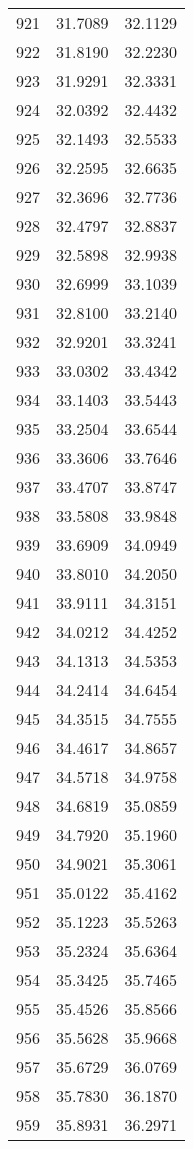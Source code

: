 \documentclass{article}
\begin{document}
\begin{longtable}{|c|c|c|}
921 & 31.7089 & 32.1129 \\
922 & 31.8190 & 32.2230 \\
923 & 31.9291 & 32.3331 \\
924 & 32.0392 & 32.4432 \\
925 & 32.1493 & 32.5533 \\
926 & 32.2595 & 32.6635 \\
927 & 32.3696 & 32.7736 \\
928 & 32.4797 & 32.8837 \\
929 & 32.5898 & 32.9938 \\
930 & 32.6999 & 33.1039 \\
931 & 32.8100 & 33.2140 \\
932 & 32.9201 & 33.3241 \\
933 & 33.0302 & 33.4342 \\
934 & 33.1403 & 33.5443 \\
935 & 33.2504 & 33.6544 \\
936 & 33.3606 & 33.7646 \\
937 & 33.4707 & 33.8747 \\
938 & 33.5808 & 33.9848 \\
939 & 33.6909 & 34.0949 \\
940 & 33.8010 & 34.2050 \\
941 & 33.9111 & 34.3151 \\
942 & 34.0212 & 34.4252 \\
943 & 34.1313 & 34.5353 \\
944 & 34.2414 & 34.6454 \\
945 & 34.3515 & 34.7555 \\
946 & 34.4617 & 34.8657 \\
947 & 34.5718 & 34.9758 \\
948 & 34.6819 & 35.0859 \\
949 & 34.7920 & 35.1960 \\
950 & 34.9021 & 35.3061 \\
951 & 35.0122 & 35.4162 \\
952 & 35.1223 & 35.5263 \\
953 & 35.2324 & 35.6364 \\
954 & 35.3425 & 35.7465 \\
955 & 35.4526 & 35.8566 \\
956 & 35.5628 & 35.9668 \\
957 & 35.6729 & 36.0769 \\
958 & 35.7830 & 36.1870 \\
959 & 35.8931 & 36.2971 \\

\end{longtable}
\end{document}

